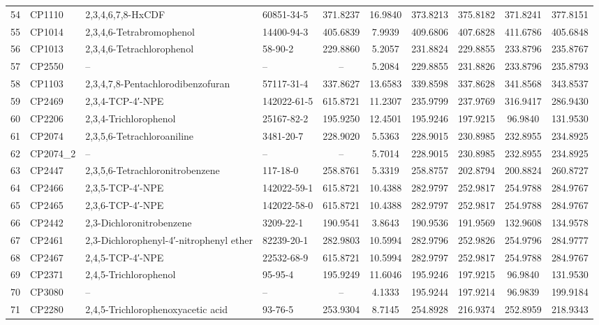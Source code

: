 \begin{longtable}{clllcccccc}
54 & CP1110 & 2,3,4,6,7,8-HxCDF & 60851-34-5 & 371.8237 & 16.9840 & 373.8213 & 375.8182 & 371.8241 & 377.8151 \\ 
55 & CP1014 & 2,3,4,6-Tetrabromophenol & 14400-94-3 & 405.6839 & 7.9939 & 409.6806 & 407.6828 & 411.6786 & 405.6848 \\ 
56 & CP1013 & 2,3,4,6-Tetrachlorophenol & 58-90-2 & 229.8860 & 5.2057 & 231.8824 & 229.8855 & 233.8796 & 235.8767 \\ 
57 & CP2550 & – & – & – & 5.2084 & 229.8855 & 231.8826 & 233.8796 & 235.8793 \\ 
58 & CP1103 & 2,3,4,7,8-Pentachlorodibenzofuran & 57117-31-4 & 337.8627 & 13.6583 & 339.8598 & 337.8628 & 341.8568 & 343.8537 \\ 
59 & CP2469 & 2,3,4-TCP-4′-NPE & 142022-61-5 & 615.8721 & 11.2307 & 235.9799 & 237.9769 & 316.9417 & 286.9430 \\ 
60 & CP2206 & 2,3,4-Trichlorophenol & 25167-82-2 & 195.9250 & 12.4501 & 195.9246 & 197.9215 & 96.9840 & 131.9530 \\ 
61 & CP2074 & 2,3,5,6-Tetrachloroaniline & 3481-20-7 & 228.9020 & 5.5363 & 228.9015 & 230.8985 & 232.8955 & 234.8925 \\ 
62 & CP2074\_2 & – & – & – & 5.7014 & 228.9015 & 230.8985 & 232.8955 & 234.8925 \\ 
63 & CP2447 & 2,3,5,6-Tetrachloronitrobenzene & 117-18-0 & 258.8761 & 5.3319 & 258.8757 & 202.8794 & 200.8824 & 260.8727 \\ 
64 & CP2466 & 2,3,5-TCP-4′-NPE & 142022-59-1 & 615.8721 & 10.4388 & 282.9797 & 252.9817 & 254.9788 & 284.9767 \\ 
65 & CP2465 & 2,3,6-TCP-4′-NPE & 142022-58-0 & 615.8721 & 10.4388 & 282.9797 & 252.9817 & 254.9788 & 284.9767 \\ 
66 & CP2442 & 2,3-Dichloronitrobenzene & 3209-22-1 & 190.9541 & 3.8643 & 190.9536 & 191.9569 & 132.9608 & 134.9578 \\ 
67 & CP2461 & 2,3-Dichlorophenyl-4′-nitrophenyl ether & 82239-20-1 & 282.9803 & 10.5994 & 282.9796 & 252.9826 & 254.9796 & 284.9777 \\ 
68 & CP2467 & 2,4,5-TCP-4′-NPE & 22532-68-9 & 615.8721 & 10.5994 & 282.9797 & 252.9817 & 254.9788 & 284.9767 \\ 
69 & CP2371 & 2,4,5-Trichlorophenol & 95-95-4 & 195.9249 & 11.6046 & 195.9246 & 197.9215 & 96.9840 & 131.9530 \\ 
70 & CP3080 & – & – & – & 4.1333 & 195.9244 & 197.9214 & 96.9839 & 199.9184 \\ 
71 & CP2280 & 2,4,5-Trichlorophenoxyacetic acid & 93-76-5 & 253.9304 & 8.7145 & 254.8928 & 216.9374 & 252.8959 & 218.9343 \\ 

\end{longtable}
